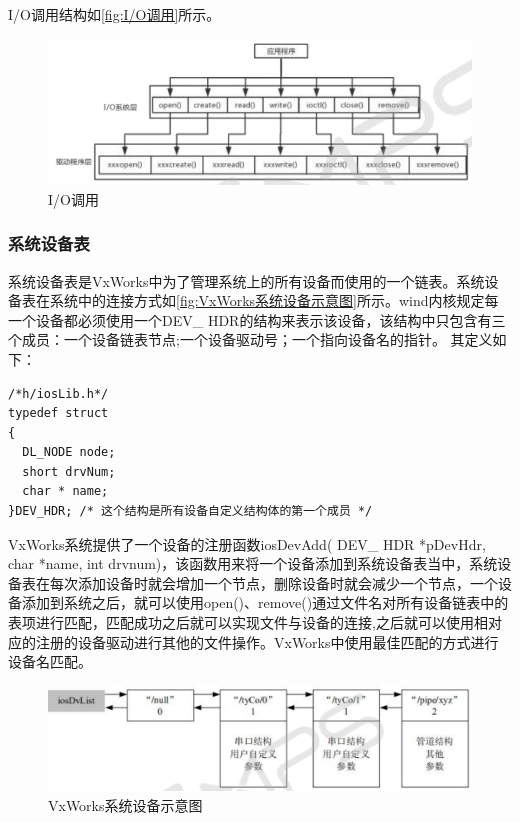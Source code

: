 	I/O调用结构如\autoref{fig:I/O调用}所示。
	\begin{figure}[!h]
\centering
\includegraphics[width=1.0\textwidth]{./graphics/IOCall.pdf}
\caption{I/O调用}\label{fig:I/O调用}
\end{figure}

	
\subsubsection{系统设备表}
	系统设备表是VxWorks中为了管理系统上的所有设备而使用的一个链表。系统设备表在系统中的连接方式如\autoref{fig:VxWorks系统设备示意图}所示。wind内核规定每一个设备都必须使用一个DEV\_ HDR的结构来表示该设备，该结构中只包含有三个成员：一个设备链表节点;一个设备驱动号；一个指向设备名的指针。
	其定义如下\cite{VxWorks内核解读}：
\lstset{language=C}
\begin{lstlisting}
/*h/iosLib.h*/
typedef struct
{ 
  DL_NODE node; 
  short drvNum;  
  char * name; 
}DEV_HDR; /* 这个结构是所有设备自定义结构体的第一个成员 */
\end{lstlisting}

VxWorks系统提供了一个设备的注册函数iosDevAdd( DEV\_ HDR *pDevHdr, char *name, int drvnum)，该函数用来将一个设备添加到系统设备表当中，系统设备表在每次添加设备时就会增加一个节点，删除设备时就会减少一个节点，一个设备添加到系统之后，就可以使用open()、remove()通过文件名对所有设备链表中的表项进行匹配，匹配成功之后就可以实现文件与设备的连接\cite{刘小军2008基于},之后就可以使用相对应的注册的设备驱动进行其他的文件操作。VxWorks中使用最佳匹配的方式进行设备名匹配。


\begin{figure}[!h]
\centering
\includegraphics[width=1.0\textwidth]{./graphics/vxworks-device-link.pdf}
\caption{VxWorks系统设备示意图}\label{fig:VxWorks系统设备示意图}
\end{figure}

